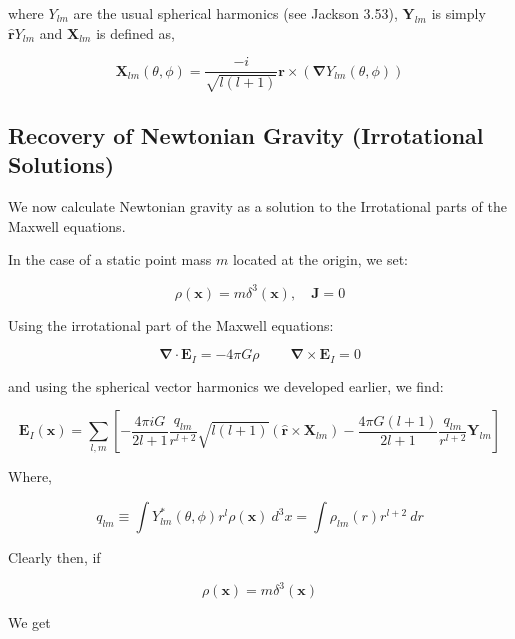 \documentclass {article}
\renewcommand\vec{\mathbf}
\let\OldS\nabla
\renewcommand{\nabla}{\boldsymbol{\OldS}}
\let\OldHat\hat
\renewcommand{\hat}[1]{\OldHat{\mathbf{#1}}}
\begin{document}
where $Y_{lm}$ are the usual spherical harmonics (see Jackson 3.53), $\vec Y_{lm}$ is simply $\hat r Y_{lm}$  and $\vec X_{lm}$ is defined as,


\begin{equation}
\vec X_{lm}(\theta, \phi) = \frac {-i}{\sqrt{l(l+1)}} \vec r \times \left( \nabla Y_{lm}(\theta, \phi) \right) 
\label{eq:xlm}
\end{equation}

\subsection{Recovery of Newtonian Gravity (Irrotational Solutions)}

We now calculate Newtonian gravity as a solution to the Irrotational parts of the Maxwell equations.

In the case of a static point mass \( m \) located at the origin, we set:

\begin{equation}
\rho(\vec{x}) = m \delta^3(\vec{x}), \quad \vec{J} = 0
\end{equation}


Using the irrotational part of the Maxwell equations:


\begin{equation}
\nabla \cdot \vec{E}_I = -4 \pi G \rho ~~~~~~~~~~ \nabla \times \vec{E}_I = 0
\end{equation}

and using the spherical vector harmonics we developed earlier,  we find:


\begin{equation}
\vec E_I(\vec x) = \sum_{l,m} \left[ -\frac {4\pi i G }{2l+1} \frac {q_{lm}}{r^{l+2}} \sqrt {l(l+1)} \left(\hat r \times \vec X_{lm} \right)  - \frac {4 \pi G (l+1)}{2l+1} \frac {q_{lm}}{r^{l+2}} \vec Y_{lm} \right] 
\end{equation}

Where,

\begin{equation}
q_{lm} \equiv \int Y_{lm}^* (\theta, \phi) r^l  \rho (\vec x) ~ d^3x = \int \rho_{lm} (r) r^{l+2} ~ dr 
\end{equation}

Clearly then, if

\begin{equation}
\rho(\vec{x}) = m \delta^3(\vec{x})
\end{equation}


We get
\end{document}
